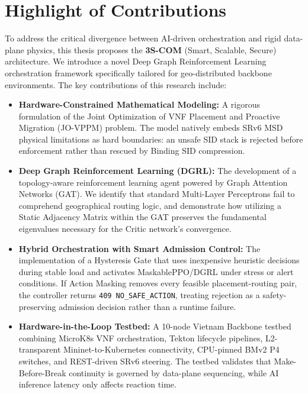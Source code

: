 \documentclass[12pt, a4paper, reqno, oneside]{book}
\begin{document}
\section{Highlight of Contributions}
To address the critical divergence between AI-driven orchestration and rigid data-plane physics, this thesis proposes the \textbf{3S-COM} (Smart, Scalable, Secure) architecture. We introduce a novel Deep Graph Reinforcement Learning orchestration framework specifically tailored for geo-distributed backbone environments. The key contributions of this research include:

\begin{itemize}
    \item \textbf{Hardware-Constrained Mathematical Modeling:} A rigorous formulation of the Joint Optimization of VNF Placement and Proactive Migration (JO-VPPM) problem. The model natively embeds SRv6 MSD physical limitations as hard boundaries: an unsafe SID stack is rejected before enforcement rather than rescued by Binding SID compression.
    \item \textbf{Deep Graph Reinforcement Learning (DGRL):} The development of a topology-aware reinforcement learning agent powered by Graph Attention Networks (GAT). We identify that standard Multi-Layer Perceptrons fail to comprehend geographical routing logic, and demonstrate how utilizing a Static Adjacency Matrix within the GAT preserves the fundamental eigenvalues necessary for the Critic network's convergence.
    \item \textbf{Hybrid Orchestration with Smart Admission Control:} The implementation of a Hysteresis Gate that uses inexpensive heuristic decisions during stable load and activates MaskablePPO/DGRL under stress or alert conditions. If Action Masking removes every feasible placement-routing pair, the controller returns \texttt{409 NO\_SAFE\_ACTION}, treating rejection as a safety-preserving admission decision rather than a runtime failure.
    \item \textbf{Hardware-in-the-Loop Testbed:} A 10-node Vietnam Backbone testbed combining MicroK8s VNF orchestration, Tekton lifecycle pipelines, L2-transparent Mininet-to-Kubernetes connectivity, CPU-pinned BMv2 P4 switches, and REST-driven SRv6 steering. The testbed validates that Make-Before-Break continuity is governed by data-plane sequencing, while AI inference latency only affects reaction time.
\end{itemize}
\end{document}
